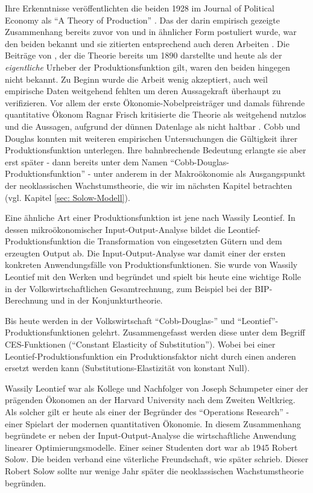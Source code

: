 Ihre Erkenntnisse veröffentlichten die beiden 1928 im Journal of Political Economy als "`A Theory of Production"' \parencite{Cobb1928}. Das der darin empirisch gezeigte Zusammenhang bereits zuvor von \textcite{Wicksteed1894} und \textcite{Clark1899} in ähnlicher Form postuliert wurde, war den beiden bekannt und sie zitierten entsprechend auch deren Arbeiten \parencite[S. 151]{Cobb1928}. Die Beiträge von \textcite{Wicksell1922}, der die Theorie bereits um 1890 darstellte und heute als der \textit{eigentliche} Urheber der Produktionsfunktion gilt, waren den beiden hingegen nicht bekannt. Zu Beginn wurde die Arbeit wenig akzeptiert, auch weil empirische Daten weitgehend fehlten um deren Aussagekraft überhaupt zu verifizieren. Vor allem der erste Ökonomie-Nobelpreisträger und damals führende quantitative Ökonom Ragnar Frisch kritisierte die Theorie als weitgehend nutzlos und die Aussagen, aufgrund der dünnen Datenlage als nicht haltbar \parencite[S. 905]{Douglas1976}. Cobb und Douglas konnten mit weiteren empirischen Untersuchungen die Gültigkeit ihrer Produktionsfunktion unterlegen. Ihre bahnbrechende Bedeutung erlangte sie aber erst später - dann bereits unter dem Namen "`Cobb-Douglas-Produktionsfunktion"' - unter anderem in der Makroökonomie als Ausgangspunkt der neoklassischen Wachstumstheorie, die wir im nächsten Kapitel betrachten (vgl. Kapitel \ref{sec: Solow-Modell}). 

Eine ähnliche Art einer Produktionsfunktion ist jene nach Wassily Leontief. In dessen mikroökonomischer Input-Output-Analyse bildet die Leontief-Produktionsfunktion die Transformation von eingesetzten Gütern und dem erzeugten Output ab. Die Input-Output-Analyse war damit einer der ersten konkreten Anwendungsfälle von Produktionsfunktionen. Sie wurde von Wassily Leontief mit den Werken \textcite{Leontief1936} und \textcite{Leontief1941} begründet und spielt bis heute eine wichtige Rolle in der Volkswirtschaftlichen Gesamtrechnung, zum Beispiel bei der BIP-Berechnung und in der Konjunkturtheorie.

Bis heute werden in der Volkswirtschaft "`Cobb-Douglas-"' und "`Leontief"'-Produktionsfunktionen gelehrt. Zusammengefasst werden diese unter dem Begriff CES-Funktionen ("`Constant Elasticity of Substitution"'). Wobei bei einer Leontief-Produktionsfunktion ein Produktionsfaktor nicht durch einen anderen ersetzt werden kann (Substitutions-Elastizität von konstant Null).

Wassily Leontief war als Kollege und Nachfolger von Joseph Schumpeter einer der prägenden Ökonomen an der Harvard University nach dem Zweiten Weltkrieg. Als solcher gilt er heute als einer der Begründer des "`Operations Research"' - einer Spielart der modernen quantitativen Ökonomie. In diesem Zusammenhang begründete er neben der Input-Output-Analyse die wirtschaftliche Anwendung linearer Optimierungsmodelle. Einer seiner Studenten dort war ab 1945 Robert Solow. Die beiden verband eine väterliche Freundschaft, wie \textcite{Solow1987a} später schrieb. Dieser Robert Solow sollte nur wenige Jahr später die neoklassischen Wachstumstheorie begründen.

